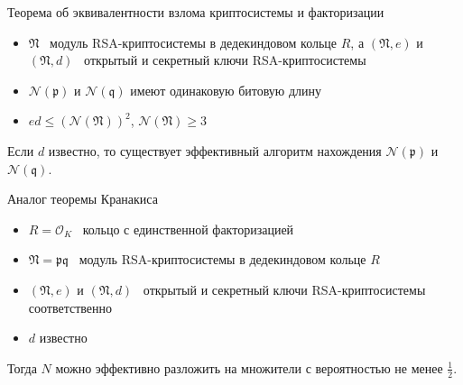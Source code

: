 \documentclass[8pt, xcolor=x11names]{beamer}
\begin{document}
\begin{frame}
    \begin{block}{Теорема об эквивалентности взлома криптосистемы и факторизации}
        \begin{itemize}
            \item $\mathfrak{N}$ \textendash\ модуль RSA-криптосистемы в дедекиндовом кольце $R$, а $(\mathfrak{N}, e)$ и $(\mathfrak{N}, d)$ \textendash\ открытый и секретный ключи RSA-криптосистемы
            
            \item $\mathcal{N}(\mathfrak{p})$ и $\mathcal{N}(\mathfrak{q})$ имеют одинаковую битовую длину
            
            \item $ed \le (\mathcal{N}(\mathfrak{N}))^2$, $\mathcal{N}(\mathfrak{N}) \ge 3$
        \end{itemize}
        Если $d$ известно, то существует эффективный алгоритм нахождения $\mathcal{N}(\mathfrak{p})$ и $\mathcal{N}(\mathfrak{q})$.
    \end{block}
    
    \begin{block}{Аналог теоремы Кранакиса}
        \begin{itemize}
            \item $R = \mathcal{O}_K$ \textendash\ кольцо с единственной факторизацией
            
            \item  $\mathfrak{N} = \mathfrak{p}\mathfrak{q}$ \textendash\ модуль RSA-криптосистемы в дедекиндовом кольце $R$
            
            \item $(\mathfrak{N}, e)$ и $(\mathfrak{N}, d)$ \textendash\ открытый и секретный ключи RSA-криптосистемы соответственно
            
            \item $d$ известно
        \end{itemize}
        Тогда $N$ можно эффективно разложить на множители с вероятностью не менее $\frac{1}{2}$.
    \end{block}
\end{frame}
\end{document}
